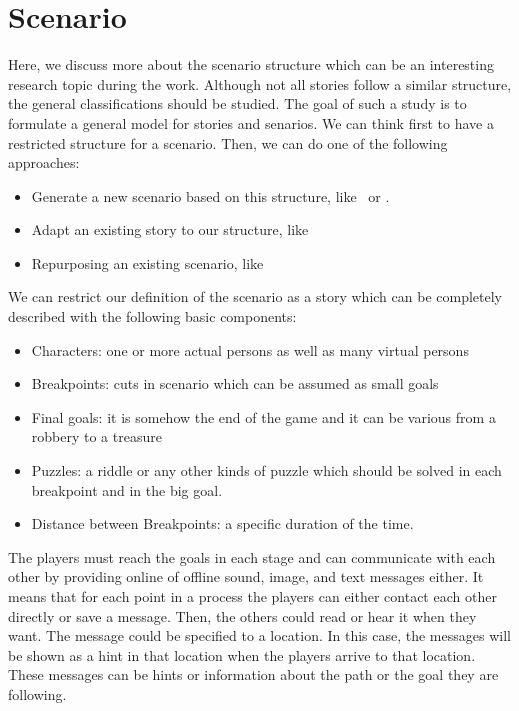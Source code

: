 \documentclass[conference]{IEEEtran}
\begin{document}
\section{Scenario}
\cite{scenario}
Here, we discuss more about the scenario structure which can be
an interesting research topic during the work.
Although not all stories follow a similar structure,
the general classifications should be studied. The goal of such a study is to 
formulate a general model for stories and senarios.
We can think first to have a restricted structure for a scenario.
Then, we can do one of the following approaches: 
\begin{itemize}
\item Generate a new scenario based on this structure, like~\cite{scenario-gen} or \cite{l-system}.
\item Adapt an existing story to our structure, like~\cite{scenario-adapt}
\item Repurposing an existing scenario, like~\cite{scneario-repurposing}
\end{itemize}

We can restrict our definition of the scenario as a story which
can be completely described with the following basic components:
\begin{itemize}
\item Characters: one or more actual persons as well as many virtual persons
\item Breakpoints: cuts in scenario which can be assumed as small goals 
\item Final goals: it is somehow the end of the game and 
it can be various from a robbery to a treasure
\item Puzzles: a riddle or any other kinds of puzzle which should be solved in each 
      breakpoint and in the big goal.
\item Distance between Breakpoints: a specific duration of the time.
\end{itemize}

The players must reach the goals in each stage and can communicate with each other by providing online of offline sound, image, and text messages either. It means that for each point in a process the players can either contact each other directly or save a message. Then, the others could read or hear it when they want. The message could be specified to a location. In this case, the messages will be shown as a hint in that location when the players arrive to that location. These messages can be hints or information about the path or the goal they are following.
\end{document}
